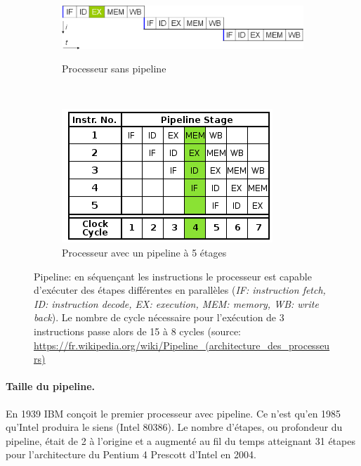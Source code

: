 \begin{figure}
    \begin{subfigure}[]{0.5\linewidth}\centering
        \vspace{1.6cm}
        \includegraphics[width=\linewidth]{images/Chapitre1/pipelineNo.png}
        \label{pic_pip_no}
        \caption{Processeur sans pipeline}
    \end{subfigure}%
    ~ %
    \begin{subfigure}[]{0.5\linewidth}\centering
        \includegraphics[width=.7\linewidth]{images/Chapitre1/pipelineYes.png}
        \caption{Processeur avec un pipeline à 5 étages}
        \label{pic_pip_yes}
    \end{subfigure}
    
    \caption{Pipeline: en séquençant les instructions le processeur est capable d'exécuter des étapes différentes en parallèles (\textit{IF: instruction fetch, ID: instruction decode, EX: execution, MEM: memory, WB: write back}). Le nombre de cycle nécessaire pour l'exécution de 3 instructions passe alors de 15 à 8 cycles (source: \url{https://fr.wikipedia.org/wiki/Pipeline_(architecture_des_processeurs)} }
    \label{pic_pipeline}
\end{figure}




\paragraph{Taille du pipeline.}
En 1939 IBM conçoit le premier processeur avec pipeline. Ce n'est qu'en 1985 qu'Intel produira le siens (Intel 80386). Le nombre d'étapes, ou profondeur du pipeline, était de 2 à l'origine et a augmenté au fil du temps atteignant 31 étapes pour l'architecture du Pentium 4 Prescott d'Intel en 2004. 

